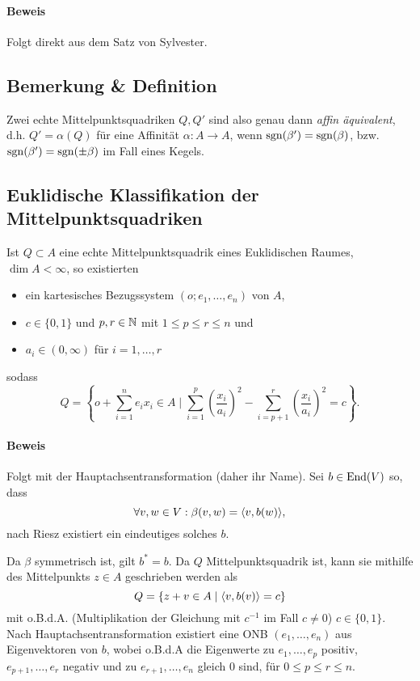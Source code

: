 \paragraph{Beweis}
	Folgt direkt aus dem Satz von Sylvester.
\subsection{Bemerkung \& Definition}
	Zwei echte Mittelpunktsquadriken $ Q,Q' $ sind also genau dann \emph{affin äquivalent}, d.h. $ Q' = \alpha(Q) $ für eine Affinität $ \alpha:A\to A $, wenn $ \operatorname{sgn}(\beta')=\operatorname{sgn}(\beta) $, bzw. $ \operatorname{sgn}(\beta')=\operatorname{sgn}(\pm \beta) $ im Fall eines Kegels.
\subsection{Euklidische Klassifikation der Mittelpunktsquadriken}
\begin{Lemma}[]
	Ist $ Q\subset A $ eine echte Mittelpunktsquadrik eines Euklidischen Raumes, $ \dim A <\infty $, so existierten 
	\begin{itemize}
		\item ein kartesisches Bezugssystem $ (o;e_1,\dots,e_n) $ von $ A $,
		\item $ c\in \{0,1\} $ und $ p,r\in \mathbb{N} $ mit $ 1\leq p\leq r\leq n $ und
		\item $ a_i\in (0,\infty) $ für $ i=1,\dots,r $
	\end{itemize}
	sodass
		\[ Q = \left\{o+\sum_{i=1}^{n}e_ix_i\in A \mid \sum_{i=1}^{p}\left(\frac{x_i}{a_i}\right)^2-\sum_{i=p+1}^{r}\left(\frac{x_i}{a_i}\right)^2 = c \right\}. \]
\end{Lemma}
\paragraph{Beweis}
	Folgt mit der Hauptachsentransformation (daher ihr Name).
	Sei $ b\in \operatorname{End}(V) $ so, dass
		\[ \forall v,w\in V: \beta(v,w) = \langle v,b(w) \rangle, \]
	nach Riesz existiert ein eindeutiges solches $ b $.
	
	Da $ \beta $ symmetrisch ist, gilt $ b^* = b $. Da $ Q $ Mittelpunktsquadrik ist, kann sie mithilfe des Mittelpunkts $ z\in A $ geschrieben werden als
		\[ Q=\left\{z+v\in A\mid \langle v,b(v) \rangle = c \right\} \]
	mit o.B.d.A. (Multiplikation der Gleichung mit $ c^{-1} $ im Fall $ c\neq 0 $) $ c\in \{0,1\} $. Nach Hauptachsentransformation existiert eine ONB $ (e_1,\dots,e_n) $ aus Eigenvektoren von $ b $, wobei o.B.d.A die Eigenwerte zu $ e_1,\dots,e_p $ positiv, $ e_{p+1},\dots,e_r $ negativ und zu $ e_{r+1},\dots,e_n $ gleich 0 sind, für $ 0\leq p\leq r\leq n $.
	

